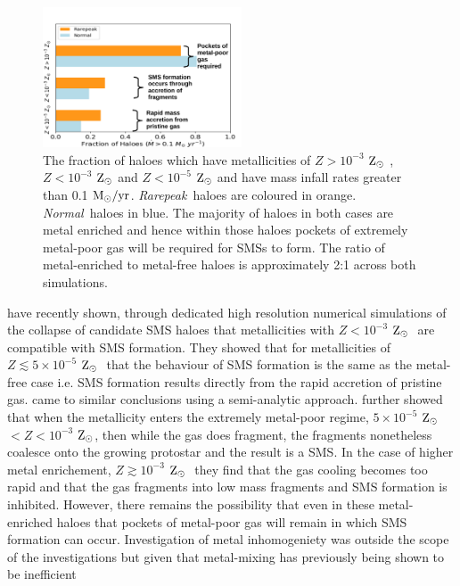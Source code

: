 \documentclass[graphics, twocolumn, usenatbib]{mn2e}
\newcommand{\msolaryrc} {$\rm{M_{\odot}/yr}$}
\newcommand{\zsolar} {$\rm{Z_{\odot}}~$}
\newcommand{\zsolarc} {$\rm{Z_{\odot}}$}
\newcommand{\rarepeak} {\textit{Rarepeak~}}
\newcommand{\normal} {\textit{Normal~}}
\begin{document}
\begin{figure}
   \centering 
\includegraphics[width=0.525\textwidth]{FIGURES/FinalPlot-crop.pdf}
\caption{The fraction of haloes which have metallicities of $Z > 10^{-3}$ \zsolar,
  $Z < 10^{-3}$ \zsolar and $ Z < 10^{-5}$ \zsolar and have mass infall rates greater than
  0.1 \msolaryrc. \rarepeak haloes are coloured in orange. \normal haloes in blue. 
  The majority of haloes in both cases are metal enriched and hence within
  those haloes pockets of extremely metal-poor gas will be required for SMSs to form. The
  ratio of metal-enriched to metal-free haloes is approximately 2:1 across both simulations.} \label{Fig:Fractions}
\end{figure}
\indent \cite{Chon_2020} have recently shown, through dedicated high resolution numerical simulations
of the collapse of candidate SMS haloes that metallicities with $Z < 10^{-3}$ \zsolar
are compatible with SMS formation. They showed that for metallicities of $Z \lesssim 5 \times 10^{-5}$ \zsolar
that the behaviour of SMS formation is the same as the metal-free case i.e. SMS formation results
directly from the rapid accretion of pristine gas. \cite{Tagawa_2020} came to similar conclusions
using a semi-analytic approach. \cite{Chon_2020} further showed that when the metallicity enters the
extremely metal-poor regime, $5 \times 10^{-5}$ \zsolar $ < Z < 10^{-3}$ \zsolarc, then while
the gas does fragment, the fragments nonetheless coalesce onto the growing protostar and the
result is a SMS. In the case of higher metal enrichement,  $Z \gtrsim 10^{-3}$ \zsolar
they find that the gas cooling becomes too rapid and that the gas fragments into low mass fragments
and SMS formation is inhibited. However, there remains the possibility that even in these
metal-enriched haloes that pockets of metal-poor gas will remain in which SMS formation can occur.
Investigation of metal inhomogeniety was outside the scope of the \cite{Chon_2020} investigations
but given that metal-mixing has previously being shown to be inefficient
\end{document}
